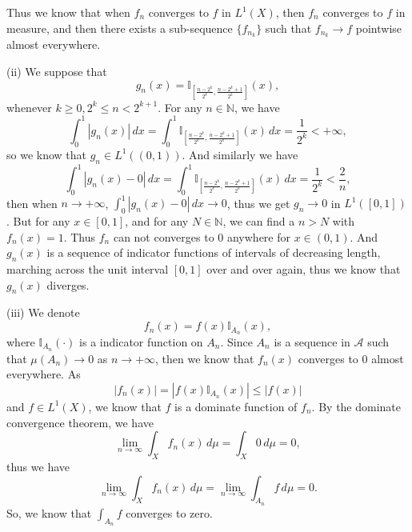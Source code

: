 \documentclass[12pt,a4paper]{ctexart}
\begin{document}
Thus we know that when $f_{n}$ converges to $f$ in $L^{1}(X)$, then $f_{n}$ converges to $f$ in measure, and then there exists a sub-sequence $\{f_{n_{k}}\}$ such that $f_{n_{k}} \to f$ pointwise almost everywhere.

\vspace{8pt}

(ii) We suppose that
\begin{equation*}
    g_{n} (x) = \mathbb{I}_{[\frac{n - 2^{k}}{2^{k}}, \frac{n - 2^{k} + 1}{2^{k}}]} (x),
\end{equation*}
whenever $k \geq 0, 2^{k} \leq n < 2^{k + 1}$. For any $n \in \mathbb{N}$, we have
\begin{equation*}
    \int_{0}^{1} | g_{n} (x) | \, d x = \int_{0}^{1} \mathbb{I}_{[\frac{n - 2^{k}}{2^{k}}, \frac{n - 2^{k} + 1}{2^{k}}]} (x) \, d x  = \frac{1}{2^{k}} < +\infty,
\end{equation*}
so we know that $g_{n} \in L^{1}((0, 1))$. And similarly we have
\begin{equation*}
    \int_{0}^{1} | g_{n} (x) - 0 | \, d x = \int_{0}^{1} \mathbb{I}_{[\frac{n - 2^{k}}{2^{k}}, \frac{n - 2^{k} + 1}{2^{k}}]} (x) \, d x  = \frac{1}{2^{k}} < \frac{2}{n},
\end{equation*}
then when $n \to + \infty$, $\int_{0}^{1} | g_{n} (x) - 0 | \, d x \to 0$, thus we get $g_{n} \to 0$ in $L^{1}([0, 1])$. But for any $x \in [0, 1]$, and for any $N \in \mathbb{N}$, we can find a $n > N$ with $f_{n} (x) = 1$. Thus $f_{n}$ can not converges to $0$ anywhere for $x \in (0, 1)$. And $g_{n}(x)$ is a sequence of indicator functions of intervals of decreasing length, marching across the unit interval $[0,1]$ over and over again, thus we know that $g_{n}(x)$ diverges.

\vspace{8pt}

(iii) We denote
\begin{equation*}
   f_{n}(x) = f(x) \mathbb{I}_{A_{n}} (x),
\end{equation*}
where $\mathbb{I}_{A_{n}} (\cdot)$ is a indicator function on $A_{n}$. Since $A_{n}$ is a sequence in $\mathcal{A}$ such that $\mu(A_{n}) \to 0$ as $n \to + \infty$, then we know that $f_{n}(x)$ converges to $0$ almost everywhere. As
\begin{equation*}
   |f_{n}(x)| = |f(x) \mathbb{I}_{A_{n}} (x)| \leq |f(x)|
\end{equation*}
and $f \in L^{1}(X)$, we know that $f$ is a dominate function of $f_{n}$. By the dominate convergence theorem, we have
\begin{equation*}
   \lim_{n \to \infty} \int_{X}^{} f_{n}(x) \, d \mu = \int_{X}^{} 0 \, d \mu = 0,
\end{equation*}
thus we have
\begin{equation*}
   \lim_{n \to \infty} \int_{X}^{} f_{n}(x) \, d \mu = \lim_{n \to \infty} \int_{A_{n}}^{} f \, d \mu = 0.
\end{equation*}
So, we know that $\int_{A_{n}}^{} f$ converges to zero.
\end{document}
